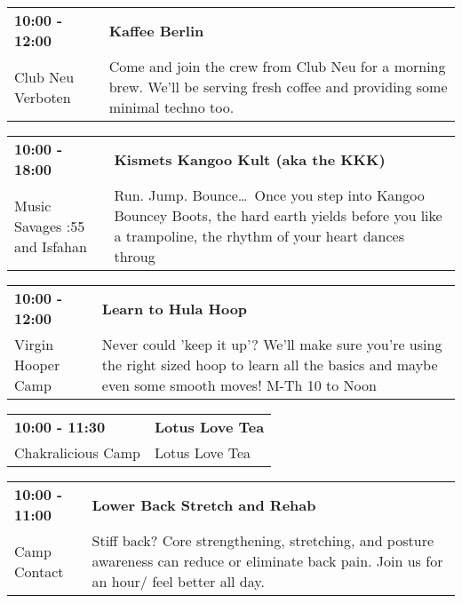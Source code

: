 \begin{tabular}{ p{1in} p{2.2in} }
    \textbf{10:00 - 12:00} & \textbf{ Kaffee Berlin } \\
    Club Neu Verboten \newline  & Come and join the crew from Club Neu for a morning brew. We'll be serving fresh coffee and providing some minimal techno too. \\
    \hline 
\end{tabular}
    
\begin{tabular}{ p{1in} p{2.2in} }
    \textbf{10:00 - 18:00} & \textbf{Kismets Kangoo Kult (aka the KKK)} \\
    Music Savages \newline 8:55 and Isfahan & Run. Jump. Bounce\ldots\ Once you step into Kangoo Bouncey Boots, the hard earth yields before you like a trampoline, the rhythm of your heart dances throug \\
    \hline 
\end{tabular}
    
\begin{tabular}{ p{1in} p{2.2in} }
    \textbf{10:00 - 12:00} & \textbf{Learn to Hula Hoop} \\
    Virgin Hooper Camp \newline  & Never could 'keep it up'? We'll make sure you're using the right sized hoop to learn all the basics and maybe even some smooth moves! M-Th 10 to Noon \\
    \hline 
\end{tabular}
    
\begin{tabular}{ p{1in} p{2.2in} }
    \textbf{10:00 - 11:30} & \textbf{Lotus Love Tea} \\
    Chakralicious Camp \newline  & Lotus Love Tea \\
    \hline 
\end{tabular}
    
\begin{tabular}{ p{1in} p{2.2in} }
    \textbf{10:00 - 11:00} & \textbf{Lower Back Stretch and Rehab} \\
    Camp Contact \newline  & Stiff back? Core strengthening, stretching, and posture awareness can reduce or eliminate back pain. Join us for an hour/ feel better all day. \\
    \hline 
\end{tabular}
    
